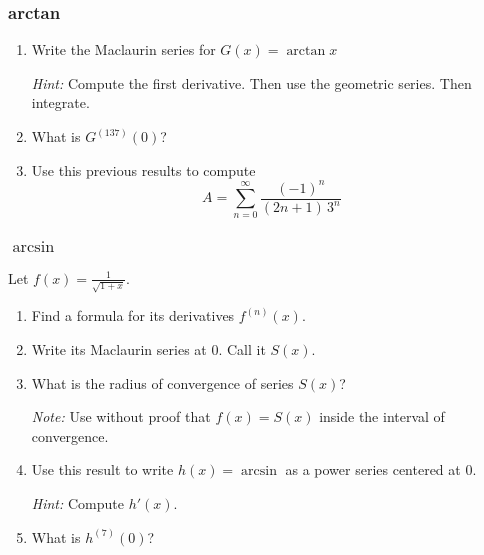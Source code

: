 \documentclass[14pt]{beamer}
\newcommand {\DS} [1] {${\displaystyle #1}$}
\newcommand{\p}{\pause}
\newcommand{\setsize}[1]{\fontsize{#1}{#1}\selectfont} %
\newcommand{\vvv}{\vspace{.2cm}}
\begin{document}
\begin{frame}[t]
\frametitle{arctan}

\begin{enumerate} 
	\item  Write the Maclaurin series for \; \DS{G(x) = \arctan x}
	\vvv
	
	\emph{Hint:}  Compute the first derivative.  Then use the geometric series.  Then integrate.
	\vvv
	
\p	\item What is \DS{G^{(137)}(0)}?
	\vvv
	
\p	\item Use this previous results to compute
		$$
			A = \sum_{n=0}^{\infty} \frac{(-1)^n}{(2n+1) \, 3^n }
		$$
\end{enumerate}

\end{frame}
\begin{frame}[t]
\frametitle{$\arcsin$}

Let \DS{f(x)=\frac{1}{\sqrt{1+x}}}.
	\begin{enumerate}
		\item  Find a formula for its derivatives \DS{f^{(n)}(x)}.
		\vvv
		\item Write its Maclaurin series at $0$.  Call it $S(x)$.
		\vvv
		\item What is the radius of convergence of series $S(x)$?
		
			{\setsize{12} 
				\emph{Note:}  Use without proof that \DS{f(x)=S(x)} inside the interval of convergence.
			}
		\vvv
		\item Use this result to write $h(x) = \arcsin$ as a power series centered at $0$.
		
			{\setsize{12}
				\emph{Hint:}  Compute \DS{h'(x)}.	
			}
		\vvv	
		\item What is \DS{h^{(7)}(0)}?
		
	\end{enumerate}

\end{frame}
\end{document}

